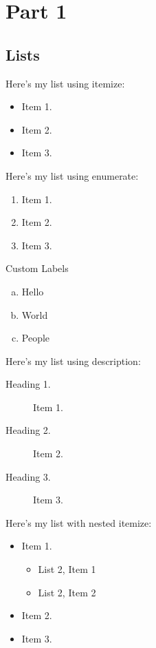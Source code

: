 \documentclass{article}
\begin{document}
\section{Part 1}

\subsection{Lists}

\noindent Here's my list using itemize:

\begin{itemize}
\item Item 1.
\item Item 2.
\item Item 3.
\end{itemize}

\noindent Here's my list using enumerate:

\begin{enumerate}
\item Item 1.
\item Item 2.
\item Item 3.
\end{enumerate}

\noindent Custom Labels

\begin{enumerate}[(a)]
\item 
  Hello
\item 
  World
\item 
  People
\end{enumerate}

\noindent Here's my list using description:

\begin{description}
\item[Heading 1.] Item 1.
\item[Heading 2.] Item 2.
\item[Heading 3.] Item 3.
\end{description}

\noindent Here's my list with nested itemize:

\begin{itemize}
\item Item 1.
\begin{itemize}
\item List 2, Item 1
\item List 2, Item 2
\end{itemize}
\item Item 2.
\item Item 3.
\end{itemize}
\end{document}
